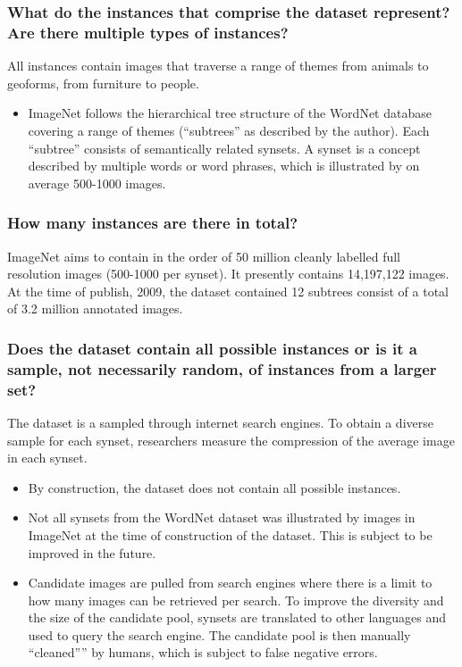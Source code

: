 \documentclass[a4paper,12pt]{article}
\begin{document}
\subsubsection*{What do the instances that comprise the dataset represent? Are there multiple types of instances?}

All instances contain images that traverse a range of themes from animals to geoforms, from
furniture to people.
\begin{itemize}
\item ImageNet follows the hierarchical tree structure of the WordNet database covering a range
of themes (``subtrees'' as described by the author). Each ``subtree'' consists of semantically
related synsets. A synset is a concept described by multiple words or word phrases, which is
illustrated by on average 500-1000 images.
\end{itemize}

\subsubsection*{How many instances are there in total?}

ImageNet aims to contain in the order of 50 million cleanly labelled full resolution images (500-1000
per synset). It presently contains 14,197,122 images. At the time of publish, 2009, the dataset
contained 12 subtrees consist of a total of 3.2 million annotated images.

\subsubsection*{Does the dataset contain all possible instances or is it a sample, not necessarily random, of
instances from a larger set?}

The dataset is a sampled through internet search engines. To obtain a diverse sample for each
synset, researchers measure the compression of the average image in each synset.
\begin{itemize}
\item By construction, the dataset does not contain all possible instances.
\item Not all synsets from the WordNet dataset was illustrated by images in ImageNet at the time
of construction of the dataset. This is subject to be improved in the future.
\item Candidate images are pulled from search engines where there is a limit to how many images
can be retrieved per search. To improve the diversity and the size of the candidate pool,
synsets are translated to other languages and used to query the search engine. The
candidate pool is then manually ``cleaned”'' by humans, which is subject to false negative
errors.
\end{itemize}
\end{document}
